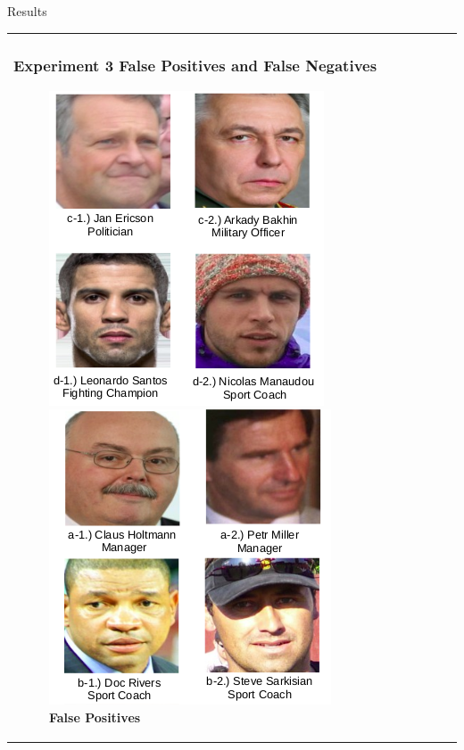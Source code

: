 \documentclass[11pt]{beamer}
\begin{document}
\begin{frame}{Results}
\begin{tabular}{l}
\parbox{1\linewidth}{
\frametitle{Experiment 3 False Positives and False Negatives}
\begin{figure}[H]
  \centering
  \begin{minipage}[b]{0.4\textwidth}
    \includegraphics[width=\textwidth]{figures/ex2_fp.png}
    \caption{\textbf{False Positives}}
    \label{fig:ex2fp}
  \end{minipage}
  \hfill
  \begin{minipage}[b]{0.4\textwidth}
   \includegraphics[width=\textwidth]{figures/ex2_fn.png}

\end{minipage}
\end{figure}}
\end{tabular}
\end{frame}
\end{document}
